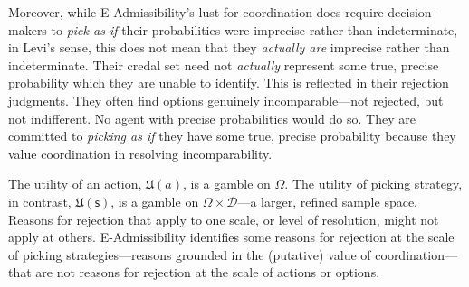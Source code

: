 \documentclass[a4paper,final]{article}
\newcommand\U{\mathfrak{U}} %
\newcommand{\D}{\mathcal{D}}
\newcommand\s{\mathsf{s}}
\renewcommand{\color}[1]{}
\newenvironment{CCM rewritten}
{\begingroup\color{blue}} %
{\endgroup}              %
\begin{document}
Moreover, while E-Admissibility's lust for coordination does require decision-makers to \emph{pick as if} their probabilities were imprecise rather than indeterminate, in Levi's sense, this does not mean that they \emph{actually are} imprecise rather than indeterminate. Their credal set need not \emph{actually} represent some true, precise probability which they are unable to identify. This is reflected in their rejection judgments. They often find options genuinely incomparable---not rejected, but not indifferent. No agent with precise probabilities would do so. They are committed to \emph{picking as if} they have some true, precise probability because they value coordination in resolving incomparability.

The utility of an action, $\U(a)$, is a gamble on $\Omega$. The utility of picking strategy, in contrast, $\U(\s)$, is a gamble on $\Omega\times\D$---a larger, refined sample space. Reasons for rejection that apply to one scale, or level of resolution, might not apply at others. E-Admissibility identifies some reasons for rejection at the scale of picking strategies---reasons grounded in the (putative) value of coordination---that are not reasons for rejection at the scale of actions or options. 


\end{document}
